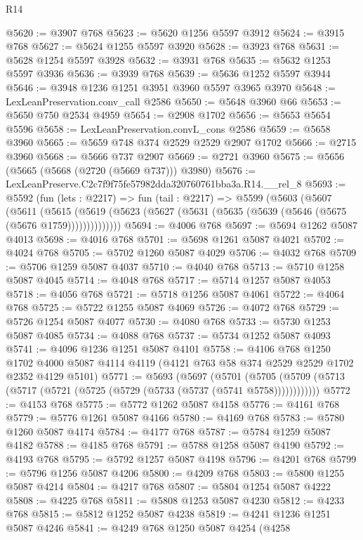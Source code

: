 \begin{lexlean}{R14}
\begin{coremodule}
@5620 := @3907 @768
@5623 := @5620 @1256 @5597 @3912
@5624 := @3915 @768
@5627 := @5624 @1255 @5597 @3920
@5628 := @3923 @768
@5631 := @5628 @1254 @5597 @3928
@5632 := @3931 @768
@5635 := @5632 @1253 @5597 @3936
@5636 := @3939 @768
@5639 := @5636 @1252 @5597 @3944
@5646 := @3948 @1236 @1251 @3951 @3960 @5597 @3965 @3970
@5648 := LexLeanPreservation.conv_call @2586
@5650 := @5648 @3960 @66
@5653 := @5650 @750 @2534 @4959
@5654 := @2908 @1702
@5656 := @5653 @5654 @5596
@5658 := LexLeanPreservation.convL_cons @2586
@5659 := @5658 @3960
@5665 := @5659 @748 @374 @2529 @2529 @2907 @1702
@5666 := @2715 @3960
@5668 := @5666 @737 @2907
@5669 := @2721 @3960
@5675 := @5656 (@5665 (@5668 (@2720 (@5669 @737))) @3980)
@5676 := LexLeanPreserve.C2c7f9f75fe57982dda320760761bba3a.R14.__rel_8
@5693 := @5592
    (fun (lets : @2217) =>
    fun (tail : @2217) =>
    @5599
      (@5603
        (@5607
          (@5611
            (@5615
              (@5619 (@5623 (@5627 (@5631 (@5635 (@5639 (@5646 (@5675 (@5676 @1759))))))))))))))
@5694 := @4006 @768
@5697 := @5694 @1262 @5087 @4013
@5698 := @4016 @768
@5701 := @5698 @1261 @5087 @4021
@5702 := @4024 @768
@5705 := @5702 @1260 @5087 @4029
@5706 := @4032 @768
@5709 := @5706 @1259 @5087 @4037
@5710 := @4040 @768
@5713 := @5710 @1258 @5087 @4045
@5714 := @4048 @768
@5717 := @5714 @1257 @5087 @4053
@5718 := @4056 @768
@5721 := @5718 @1256 @5087 @4061
@5722 := @4064 @768
@5725 := @5722 @1255 @5087 @4069
@5726 := @4072 @768
@5729 := @5726 @1254 @5087 @4077
@5730 := @4080 @768
@5733 := @5730 @1253 @5087 @4085
@5734 := @4088 @768
@5737 := @5734 @1252 @5087 @4093
@5741 := @4096 @1236 @1251 @5087 @4101
@5758 := @4106
    @768
    @1250
    @1702
    @4000
    @5087
    @4114
    @4119
    (@4121 @763 @58 @374 @2529 @2529 @1702 @2352 @4129 @5101)
@5771 := @5693
    (@5697
      (@5701 (@5705 (@5709 (@5713 (@5717 (@5721 (@5725 (@5729 (@5733 (@5737 (@5741 @5758))))))))))))
@5772 := @4153 @768
@5775 := @5772 @1262 @5087 @4158
@5776 := @4161 @768
@5779 := @5776 @1261 @5087 @4166
@5780 := @4169 @768
@5783 := @5780 @1260 @5087 @4174
@5784 := @4177 @768
@5787 := @5784 @1259 @5087 @4182
@5788 := @4185 @768
@5791 := @5788 @1258 @5087 @4190
@5792 := @4193 @768
@5795 := @5792 @1257 @5087 @4198
@5796 := @4201 @768
@5799 := @5796 @1256 @5087 @4206
@5800 := @4209 @768
@5803 := @5800 @1255 @5087 @4214
@5804 := @4217 @768
@5807 := @5804 @1254 @5087 @4222
@5808 := @4225 @768
@5811 := @5808 @1253 @5087 @4230
@5812 := @4233 @768
@5815 := @5812 @1252 @5087 @4238
@5819 := @4241 @1236 @1251 @5087 @4246
@5841 := @4249
    @768
    @1250
    @5087
    @4254
    (@4258

\end{coremodule}
\end{lexlean}

